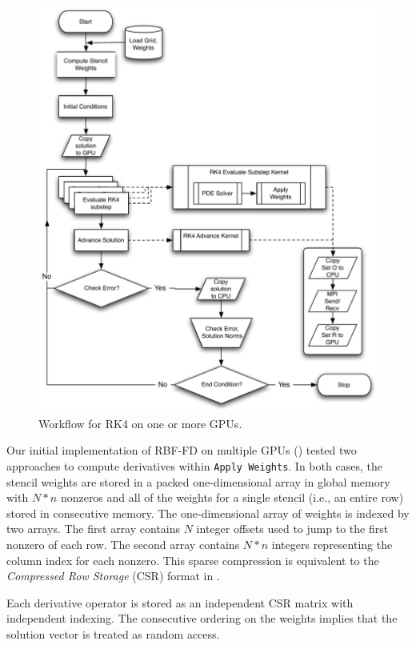 \documentclass{report}
\begin{document}
\begin{figure}[ht]
      \centering
       \includegraphics[width=5in]{../figures/paper1/figures/omnigraffle/RK4_multi_GPU_flow.pdf}
      \caption{Workflow for RK4 on one or more GPUs. }
      \label{fig:multi_GPU_flow}
\end{figure}
 
Our initial implementation of RBF-FD on multiple GPUs (\cite{BolligFlyerErlebacher2012}) tested two approaches to compute derivatives within \texttt{Apply Weights}. 
In both cases, the stencil weights are stored in  
a packed one-dimensional array in global memory with $N*n$ nonzeros and all of the weights 
for a single stencil (i.e., an entire row) stored in consecutive memory. The one-dimensional array of weights is indexed by two arrays. The first array contains $N$ integer offsets used to jump to the first nonzero of each row. The second array contains $N*n$ integers representing the column index for each nonzero. This sparse compression is equivalent to the \emph{Compressed Row Storage} (CSR) format in \cite{Bell2009, Rupp2010, Cusp2012}.

Each derivative operator is stored as an independent CSR matrix with independent indexing. The consecutive ordering on the weights implies that the solution vector %
is treated as random access. 
\end{document}
